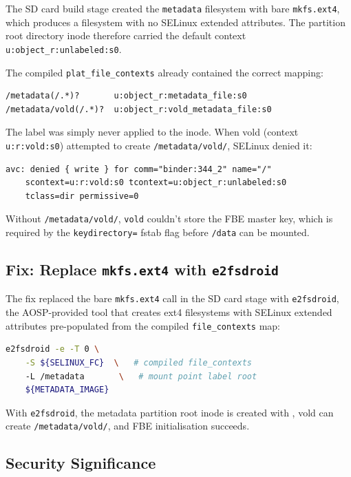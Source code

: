 The SD card build stage created the \texttt{metadata} filesystem with bare \texttt{mkfs.ext4}, which produces a filesystem with no SELinux extended attributes. The partition root directory inode therefore carried the default context \texttt{u:object\_r:unlabeled:s0}.

The compiled \texttt{plat\_file\_contexts} already contained the correct mapping:

\begin{lstlisting}
/metadata(/.*)?       u:object_r:metadata_file:s0
/metadata/vold(/.*)?  u:object_r:vold_metadata_file:s0
\end{lstlisting}

The label was simply never applied to the inode. When vold (context \texttt{u:r:vold:s0}) attempted to create \texttt{/metadata/vold/}, SELinux denied it:

\begin{lstlisting}
avc: denied { write } for comm="binder:344_2" name="/"
    scontext=u:r:vold:s0 tcontext=u:object_r:unlabeled:s0
    tclass=dir permissive=0
\end{lstlisting}

Without \texttt{/metadata/vold/}, \texttt{vold} couldn't store the FBE master key, which is required by the \texttt{keydirectory=} fstab flag before \texttt{/data} can be mounted.

\subsection{Fix: Replace \texttt{mkfs.ext4} with \texttt{e2fsdroid}}

The fix replaced the bare \texttt{mkfs.ext4} call in the SD card stage with \texttt{e2fsdroid}, the AOSP-provided tool that creates ext4 filesystems with SELinux extended attributes pre-populated from the compiled \texttt{file\_contexts} map:

\begin{lstlisting}[language=bash, caption={e2fsdroid invocation for labelled metadata partition}]
e2fsdroid -e -T 0 \
    -S ${SELINUX_FC}  \   # compiled file_contexts
    -L /metadata       \   # mount point label root
    ${METADATA_IMAGE}
\end{lstlisting}

With \texttt{e2fsdroid}, the metadata partition root inode is created with , vold can create \texttt{/metadata/vold/}, and FBE initialisation succeeds.

\subsection{Security Significance}

